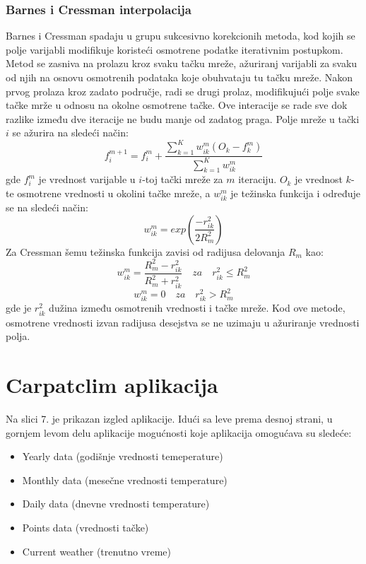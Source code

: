 \documentclass[12pt]{article}
\begin{document}
 
\subsubsection{Barnes i Cressman interpolacija}
Barnes i Cressman spadaju u grupu sukcesivno korekcionih metoda, kod kojih se polje varijabli modifikuje koristeći osmotrene podatke iterativnim postupkom. Metod se zasniva na prolazu kroz svaku tačku mreže, ažuriranj varijabli za svaku od njih na osnovu osmotrenih podataka koje obuhvataju tu tačku mreže. Nakon prvog prolaza kroz zadato područje, radi se drugi prolaz, modifikujući polje svake tačke mrže u odnosu na okolne osmotrene tačke. Ove interacije se rade sve dok razlike između dve iteracije ne budu manje od zadatog praga.  
Polje mreže u tački $i$ se ažurira na sledeći način:
\begin{equation}
f_{i}^{m+1}=f_{i}^{m}+\frac{\sum_{k=1}^{K}w_{ik}^{m}(O_{k}-f_{k}^{m})}{\sum_{k=1}^{K}w_{ik}^{m}}
\end{equation}
gde $f_{i}^m$ je vrednost varijable u $i$-toj tački mreže za $m$ iteraciju. $O_k$ je vrednost $k$-te osmotrene vrednosti u okolini tačke mreže, a $w_{ik}^m$ je težinska funkcija i određuje se na sledeći način:
\begin{equation}
w_{ik}^m = exp(\frac{-r_{ik}^{2}}{2R_{m}^2})
\end{equation}
Za Cressman šemu težinska funkcija zavisi od radijusa delovanja $R_m$ kao:
\begin{equation}\label{key}
w_{ik}^m = \frac{R_{m}^{2}-r_{ik}^2}{R_{m}^{2}+r_{ik}^2}\quad za \quad r_{ik}^{2}\leq R_{m}^2
\end{equation}
\begin{equation}\label{key}
w_{ik}^{m}=0 \quad za \quad r_{ik}^{2}> R_{m}^2
\end{equation}
gde je $r_{ik}^2$ dužina između osmotrenih vrednosti i tačke mreže. Kod ove metode, osmotrene vrednosti izvan radijusa desejstva se ne uzimaju u ažuriranje vrednosti polja. 


\newpage


\section{Carpatclim aplikacija}

Na slici 7. je prikazan izgled aplikacije. Idući sa leve prema desnoj strani, u gornjem levom delu aplikacije mogućnosti koje aplikacija omogućava su sledeće: 
\begin{itemize}
	\item Yearly data (godišnje vrednosti temeperature) 
	\item Monthly data (mesečne vrednosti temperature)
	\item Daily data (dnevne vrednosti temperature)
	\item Points data (vrednosti tačke)
	\item Current weather (trenutno vreme)
\end{itemize}
\end{document}
